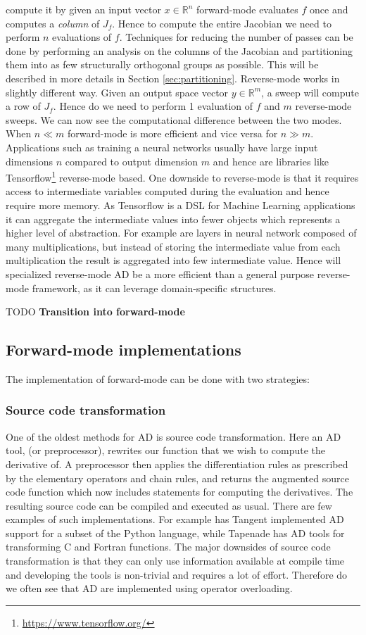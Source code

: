     compute it by given an input vector $x \in \mathbb{R}^n$  forward-mode evaluates $f$ once and
	computes a \emph{column} of $J_f$. Hence to compute the entire Jacobian we need to perform $n$ evaluations of $f$. 
	Techniques for reducing the number of passes can be done by performing an
	analysis on the columns of the 
	Jacobian and partitioning them into as few structurally orthogonal groups as
	possible. 
	This will be described in more details in Section \ref{sec:partitioning}.
	Reverse-mode works in slightly different way. Given an output space vector $y
	\in \mathbb{R}^m$, a sweep will compute a 
	row of $J_f$. Hence do we need to perform 1 evaluation of $f$ and $m$
	reverse-mode sweeps.  We can now see the 
	computational difference between the two modes. When $n \ll m$ forward-mode is
	more efficient and vice versa for $n \gg m$. 
	Applications such as training a neural networks usually have large input
	dimensions $n$ compared to output dimension $m$ and hence are 
	libraries like Tensorflow\footnote{\url{https://www.tensorflow.org/}} 
	reverse-mode based. One downside to reverse-mode is that 
	it requires access to intermediate variables computed during the evaluation and
	hence require more memory. As Tensorflow is a DSL for Machine Learning applications
	it can aggregate the intermediate values into fewer objects which represents a 
	higher level of abstraction. For example are layers in neural network composed of
	many multiplications, but instead of storing the intermediate value from each multiplication
	the result is aggregated into few intermediate value. Hence will specialized reverse-mode AD 
	be a more efficient than a general purpose reverse-mode framework, as it can leverage 
	domain-specific structures. 
	
		TODO \textbf{Transition into forward-mode}
	\subsection{Forward-mode implementations}
	The implementation of forward-mode can be done with two strategies:
	\subsubsection*{Source code transformation}
	One of the oldest methods for AD is source code transformation. Here an AD tool,
	(or preprocessor), rewrites our function that we wish to 
	compute the derivative of. A preprocessor then applies the differentiation rules
	as prescribed by the elementary operators and chain rules, 
	and returns the augmented source code function which now includes statements for
	computing the derivatives. The resulting source
	code can be compiled and executed as usual. There are few examples of such
	implementations. 
	For example has Tangent\cite{DBLP:journals/corr/abs-1711-02712} implemented AD
	support for a subset of the Python language, 
	while Tapenade has AD tools for transforming C and Fortran functions. The major
	downsides of source code transformation is that 
	they can only use information available at compile time and developing the tools
	is non-trivial and requires a lot of effort. 
	Therefore do we often see that AD are implemented using operator overloading. 
	

